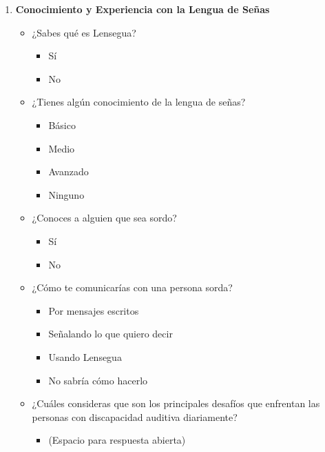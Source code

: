 \begin{enumerate}
    \item \textbf{Conocimiento y Experiencia con la Lengua de Señas}
    \begin{itemize}
        \item ¿Sabes qué es Lensegua?
        \begin{itemize}
            \item Sí
            \item No
        \end{itemize}
        \item ¿Tienes algún conocimiento de la lengua de señas?
        \begin{itemize}
            \item Básico
            \item Medio
            \item Avanzado
            \item Ninguno
        \end{itemize}
        \item ¿Conoces a alguien que sea sordo?
        \begin{itemize}
            \item Sí
            \item No
        \end{itemize}
        \item ¿Cómo te comunicarías con una persona sorda?
        \begin{itemize}
            \item Por mensajes escritos
            \item Señalando lo que quiero decir
            \item Usando Lensegua
            \item No sabría cómo hacerlo
        \end{itemize}
        \item ¿Cuáles consideras que son los principales desafíos que enfrentan las personas con discapacidad auditiva diariamente?
        \begin{itemize}
            \item (Espacio para respuesta abierta)
        \end{itemize}
    \end{itemize}


\end{enumerate}
